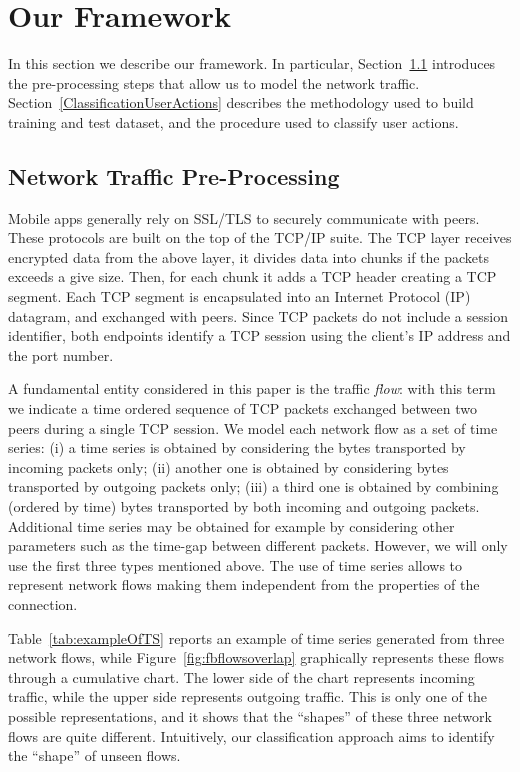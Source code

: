 \documentclass{acm_proc_article-sp}
\newcommand{\hilight}[1]{#1}
\begin{document}
\section{Our Framework}
\label{OurFramework}
In this section we describe our framework. In particular, Section~\ref{sec:networkTrafficModellingAndPreprocessing} introduces the 
pre-processing steps that allow us to model the network traffic. Section~\ref{ClassificationUserActions}
describes the methodology used to build training and test dataset, and the procedure used to classify user actions. 









\subsection{Network Traffic Pre-Processing}
\label{sec:networkTrafficModellingAndPreprocessing}
Mobile apps generally rely on SSL/TLS to securely communicate with 
peers. These protocols are built on the top of the TCP/IP suite. 
The TCP layer receives encrypted data from the above layer, it divides data 
into chunks if the packets exceeds a give size. Then, for each chunk it adds a TCP header
creating a TCP segment. Each TCP segment is encapsulated into an Internet Protocol (IP) datagram, and exchanged with 
peers.
Since TCP packets do not include a session identifier, both endpoints 
identify a TCP session using the client's IP address and the port number.



A fundamental entity considered in this paper is the traffic \emph{flow}: with this 
term we indicate a time ordered sequence of TCP packets exchanged between two peers 
during a single TCP session. 
We model each network flow as a set of time series:
(i) a time series is obtained by considering the bytes transported by 
incoming packets only; (ii) another one is obtained by considering bytes transported by 
outgoing packets only; (iii) a third one is obtained by combining (ordered by time) bytes transported by both incoming and 
outgoing packets. Additional time series may be obtained for example
by considering other parameters such as the time-gap between different packets. However, we will only use the first three types mentioned above.
\hilight{The use of time series allows to represent network flows making them independent from the properties of the connection. 
}
Table~\ref{tab:exampleOfTS} reports an example of time series generated from three network flows, while Figure~\ref{fig:fbflowsoverlap}
graphically represents these flows through a cumulative chart. The lower side of the chart represents incoming traffic, while
the upper side represents outgoing traffic. This is only one of the possible representations, and it shows that the ``shapes''
of these three network flows are quite different. Intuitively, our classification approach aims to identify the ``shape'' of \hilight{unseen flows}.
\end{document}

